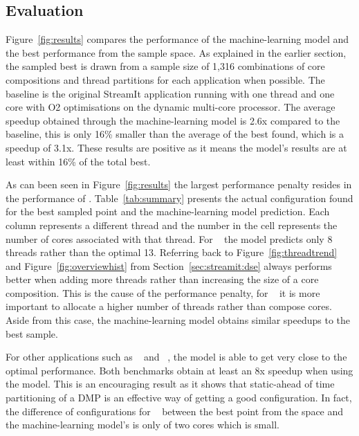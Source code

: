 \subsection{Evaluation}

Figure~\ref{fig:results} compares the performance of the machine-learning model and the best performance from the sample space.
As explained in the earlier section, the sampled best is drawn from a sample size of 1,316 combinations of core compositions and thread partitions for each application when possible.
The baseline is the original StreamIt application running with one thread and one core with O2 optimisations on the dynamic multi-core processor.
The average speedup obtained through the machine-learning model is 2.6x compared to the baseline, this is only 16\% smaller than the average of the best found, which is a speedup of 3.1x.
These results are positive as it means the model's results are at least within 16\% of the total best.

As can been seen in Figure~\ref{fig:results} the largest performance penalty resides in the performance of .
Table~\ref{tab:summary} presents the actual configuration found for the best sampled point and the machine-learning model prediction.
Each column represents a different thread and the number in the cell represents the number of cores associated with that thread.
For ~ the model predicts only 8 threads rather than the optimal 13.
Referring back to Figure~\ref{fig:threadtrend} and Figure~\ref{fig:overviewhist} from Section~\ref{sec:streamit:dse}  always performs better when adding more threads rather than increasing the size of a core composition.
This is the cause of the performance penalty, for ~ it is more important to allocate a higher number of threads rather than compose cores.
Aside from this case, the machine-learning model obtains similar speedups to the best sample.

For other applications such as ~ and ~, the model is able to get very close to the optimal performance.
Both benchmarks obtain at least an 8x speedup when using the model.
This is an encouraging result as it shows that static-ahead of time partitioning of a DMP is an effective way of getting a good configuration.
In fact, the difference of configurations for ~ between the best point from the space and the machine-learning model's is only of two cores which is small.

